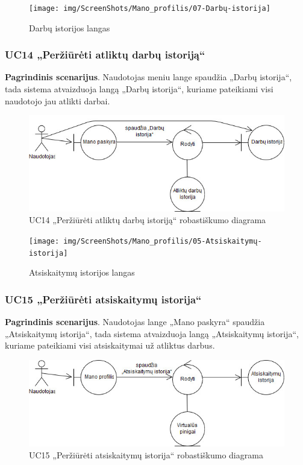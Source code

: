 \documentclass{VUMIFPSbakalaurinis}
\begin{document}
\begin{figure}[H]
	\centering
	\texttt{[image: img/ScreenShots/Mano\_profilis/07-Darbų-istorija]}
	\caption{Darbų istorijos langas}
	\label{img:work history}
\end{figure}
\subsubsection{UC14 „Peržiūrėti atliktų darbų istoriją“}
\textbf{Pagrindinis scenarijus}. Naudotojas meniu lange spaudžia „Darbų istorija“, tada sistema atvaizduoja langą „Darbų istorija“, kuriame pateikiami visi naudotojo jau atlikti darbai.

\begin{figure}[H]
	\centering
	\includegraphics[scale=0.6]{img/Robustness/UC14}
	\caption{UC14 „Peržiūrėti atliktų darbų istoriją“ robastiškumo diagrama}
	\label{img:uc14rob}
\end{figure}

\begin{figure}[H]
	\centering
	\texttt{[image: img/ScreenShots/Mano\_profilis/05-Atsiskaitymų-istorija]}
	\caption{Atsiskaitymų istorijos langas}
	\label{img:payment history}
\end{figure}
\subsubsection{UC15 „Peržiūrėti atsiskaitymų istorija“}
\textbf{Pagrindinis scenarijus}. Naudotojas lange „Mano paskyra“ spaudžia „Atsiskaitymų istorija“, tada sistema atvaizduoja langą „Atsiskaitymų istorija“, kuriame pateikiami visi atsiskaitymai už atliktus darbus.

\begin{figure}[H]
	\centering
	\includegraphics[scale=0.6]{img/Robustness/UC15}
	\caption{UC15 „Peržiūrėti atsiskaitymų istorija“ robastiškumo diagrama}
	\label{img:uc15rob}
\end{figure}
\end{document}
